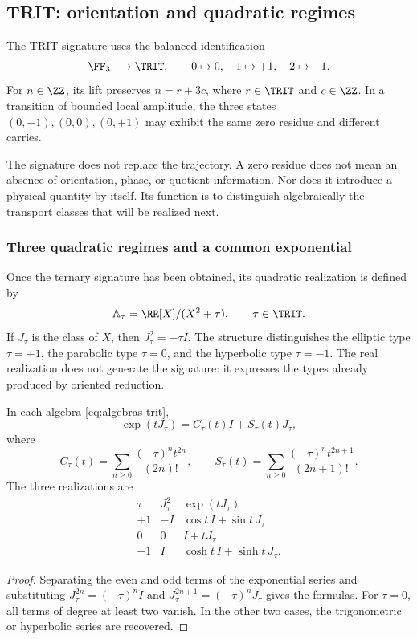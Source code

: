 \subsection{TRIT: orientation and quadratic regimes}

\begin{definition}
The TRIT signature uses the balanced identification
\[
 \FF_3\longrightarrow\TRIT,\qquad 0\mapsto0,\quad1\mapsto+1,\quad2\mapsto-1.
\]
For \(n\in\ZZ\), its lift preserves \(n=r+3c\), where \(r\in\TRIT\) and \(c\in\ZZ\). In a transition of bounded local amplitude, the three states \((0,-1),(0,0),(0,+1)\) may exhibit the same zero residue and different carries.
\end{definition}

The signature does not replace the trajectory. A zero residue does not mean an absence of orientation, phase, or quotient information. Nor does it introduce a physical quantity by itself. Its function is to distinguish algebraically the transport classes that will be realized next.

\subsubsection{Three quadratic regimes and a common exponential}

Once the ternary signature has been obtained, its quadratic realization is defined by
\begin{equation}
 \mathbb A_\tau=\RR[X]/(X^2+\tau),\qquad \tau\in\TRIT.
 \label{eq:algebras-trit}
\end{equation}
If \(J_\tau\) is the class of \(X\), then \(J_\tau^2=-\tau I\). The structure distinguishes the elliptic type \(\tau=+1\), the parabolic type \(\tau=0\), and the hyperbolic type \(\tau=-1\). The real realization does not generate the signature: it expresses the types already produced by oriented reduction.

\begin{proposition}
In each algebra \eqref{eq:algebras-trit},
\begin{equation}
 \exp(tJ_\tau)=C_\tau(t)I+S_\tau(t)J_\tau,
\end{equation}
where
\[
 C_\tau(t)=\sum_{n\ge0}\frac{(-\tau)^nt^{2n}}{(2n)!},\qquad
 S_\tau(t)=\sum_{n\ge0}\frac{(-\tau)^nt^{2n+1}}{(2n+1)!}.
\]
The three realizations are
\[
 \begin{array}{c|c|c}
 \tau&J_\tau^2&\exp(tJ_\tau)\\\hline
 +1&-I&\cos t\,I+\sin t\,J_\tau\\
 0&0&I+tJ_\tau\\
 -1&I&\cosh t\,I+\sinh t\,J_\tau.
 \end{array}
\]
\end{proposition}
\begin{proof}
Separating the even and odd terms of the exponential series and substituting \(J_\tau^{2n}=(-\tau)^nI\) and \(J_\tau^{2n+1}=(-\tau)^nJ_\tau\) gives the formulas. For \(\tau=0\), all terms of degree at least two vanish. In the other two cases, the trigonometric or hyperbolic series are recovered.
\end{proof}

